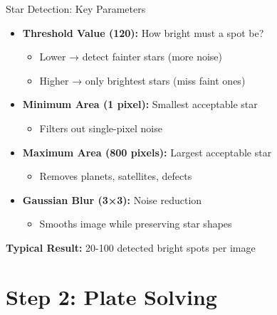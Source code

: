 \documentclass[aspectratio=169]{beamer}
\begin{document}
\begin{frame}{Star Detection: Key Parameters}
\begin{itemize}
\item \textbf{Threshold Value (120):} How bright must a spot be?
\begin{itemize}
\item Lower → detect fainter stars (more noise)
\item Higher → only brightest stars (miss faint ones)
\end{itemize}

\item \textbf{Minimum Area (1 pixel):} Smallest acceptable star
\begin{itemize}
\item Filters out single-pixel noise
\end{itemize}

\item \textbf{Maximum Area (800 pixels):} Largest acceptable star
\begin{itemize}
\item Removes planets, satellites, defects
\end{itemize}

\item \textbf{Gaussian Blur (3×3):} Noise reduction
\begin{itemize}
\item Smooths image while preserving star shapes
\end{itemize}
\end{itemize}

\textcolor{stargreen}{\textbf{Typical Result:} 20-100 detected bright spots per image}
\end{frame}

\section{Step 2: Plate Solving}
\end{document}
